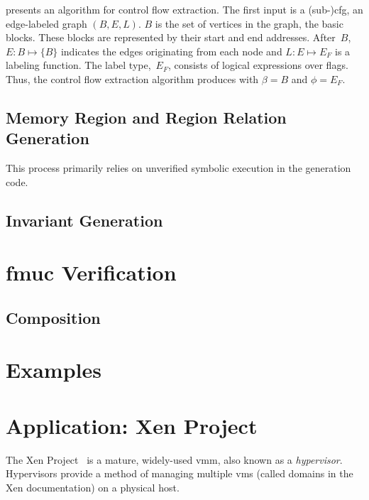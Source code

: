  presents an algorithm for control flow extraction.
The first input is a (sub-)\ac{cfg}, an edge-labeled graph $(B,E,L)$.
$B$ is the set of vertices in the graph, the basic blocks.%
These blocks are represented by their start and end addresses.
After~$B$, $E:B\mapsto\{B\}$ indicates the edges originating from each node
and $L:E\mapsto E_F$ is a labeling function.
The label type,~$E_F$, consists of logical expressions over flags.%
Thus, the control flow extraction algorithm
produces  with $\beta=B$ and $\phi=E_F$.





\subsection{Memory Region and Region Relation Generation}\label{sse:mem_reg}
This process primarily relies on unverified symbolic execution in the generation code.


\subsection{Invariant Generation}\label{sse:inv_gen}




\section{\acs*{fmuc} Verification}\label{se:fmuc_ver}
\subsection{Composition}\label{sse:fmuc_comp}

\section{Examples}\label{se:syntax_example}

\section{Application: Xen Project}\label{se:xen}
The Xen Project~\citep{chisnall2008definitive}
is a mature, widely-used \ac{vmm}, also known as a \emph{hypervisor}.
Hypervisors provide a method of managing multiple
\acp{vm} (called domains in the Xen documentation) on a physical host.

